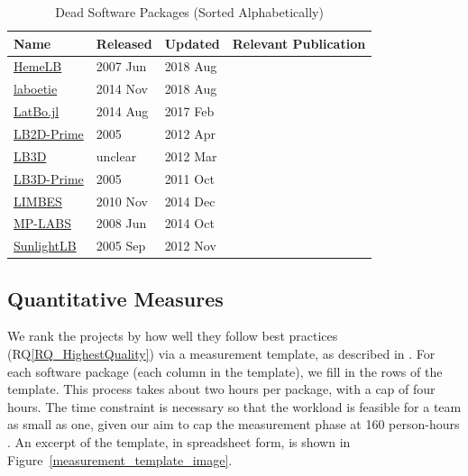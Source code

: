\documentclass[final, 3p, times, authoryear]{elsarticle}
\newcommand{\rqref}[1]{RQ\ref{#1}}
\begin{document}
\begin{table}[ht!]
	\begin{center}
		\begin{tabular}{ p{3cm}p{2cm}p{2cm}p{5.5cm} }
			\toprule
			Name & Released & Updated & Relevant Publication\\
			\midrule
			\href{https://github.com/UCL/hemelb}{HemeLB} & 2007 Jun & 2018 Aug&\citep{mazzeo2008hemelb}\\
			\href{https://github.com/maxlevesque/laboetie}{laboetie} & 2014 Nov & 2018 Aug&\citep{levesque2013accounting}\\		
			\href{https://github.com/UCL/LatBo.jl}{LatBo.jl} & 2014 Aug & 2017 Feb&\\
			\href{https://code.google.com/p/lb2d-prime-dev/source}{LB2D-Prime} & 2005 & 2012 Apr&\\
			\href{http://ccs.chem.ucl.ac.uk/sites/ccs.chem.ucl.ac.uk/themes/ccs2/files/lb3d-2012-03-12.tgz}{LB3D} & unclear & 2012 Mar&\citep{schmieschek2017lb3d}\\
			\href{https://code.google.com/archive/p/lb3d-prime-dev/source}{LB3D-Prime} & 2005 & 2011 Oct&\\
			\href{https://code.google.com/archive/p/limbes/source}{LIMBES} & 2010 Nov & 2014 Dec&\\
			\href{https://github.com/carlosrosales/mplabs}{MP-LABS} & 2008 Jun & 2014 Oct&\\
			\href{https://sourceforge.net/projects/sunlightlb/files/latest/download}{SunlightLB} & 2005 Sep & 2012 Nov&\\
			\bottomrule
		\end{tabular}
		\caption{Dead Software Packages (Sorted Alphabetically)} \label{deadpackages}
	\end{center}
\end{table}

\subsection{Quantitative Measures} \label{empiricalmeasures}

We rank the projects by how well they follow best practices
(\rqref{RQ_HighestQuality}) via a measurement template, as described in
\citet{SmithEtAl2021}.  For each software package (each column in the template),
we fill in the rows of the template. This process takes about two hours per
package, with a cap of four hours. The time constraint is necessary so that the
workload is feasible for a team as small as one, given our aim to cap the
measurement phase at 160 person-hours \citep{SmithEtAl2021}.  An excerpt of the
template, in spreadsheet form, is shown in
Figure~\ref{measurement_template_image}.
\end{document}
